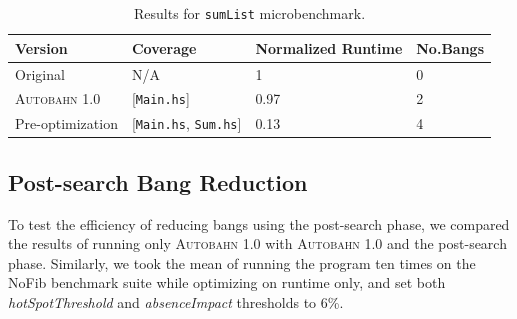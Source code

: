 \documentclass[format=sigplan, review=true]{acmart}
\newcommand{\hotspots}[0]{hot spots}
\newcommand{\hotspotcost}[0]{\textit{hotSpotThreshold}}
\newcommand{\Ao}[0]{\textsc{Autobahn 1.0}}
\newcommand{\preopt}[0]{pre-search}
\newcommand{\postopt}[0]{post-search}
\newcommand{\Postopt}[0]{Post-search}
\newcommand{\absim}[0]{\textit{absenceImpact}}
\begin{document}


\begin{table}
\begin{tabular}{p{2.5cm}p{1.5cm}p{2cm}p{1cm}}
\hline
Version   & Coverage & Normalized Runtime & No.Bangs \\
\hline
Original      & N/A   &   1	 & 0   \\
\Ao{}       & [\texttt{Main.hs}]      & 0.97    &  2\\
Pre-optimization	& [\texttt{Main.hs}, \texttt{Sum.hs}]         & 0.13      & 4\\
\hline
\end{tabular}
\caption{Results for \texttt{sumList} microbenchmark.}
\label{table:sumList}
\end{table}

\subsection{\Postopt{} Bang Reduction}

To test the efficiency of reducing bangs using the \postopt{} phase, we compared the results of running only \Ao{} with \Ao{} and the \postopt{} phase. Similarly, we took the mean of running the program ten times on the NoFib benchmark suite while optimizing on runtime only, and set both \hotspotcost{} and \absim{} thresholds to 6\%. 
\end{document}
